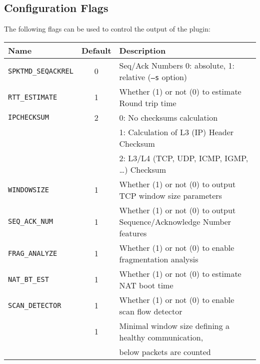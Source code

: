 \documentclass[documentation]{subfiles}
\begin{document}
\subsection{Configuration Flags}
The following flags can be used to control the output of the plugin:
\begin{longtable}{lcl}
    \toprule
    {\bf Name} & {\bf Default} & {\bf Description} \\
    \midrule\endhead%
    {\tt SPKTMD\_SEQACKREL} & 0 & Seq/Ack Numbers 0: absolute, 1: relative ({\tt --s} option)\\
    {\tt RTT\_ESTIMATE}     & 1 & Whether (1) or not (0) to estimate Round trip time\\
    {\tt IPCHECKSUM}        & 2 & 0: No checksums calculation\\
                            &   & 1: Calculation of L3 (IP) Header Checksum\\
                            &   & 2: L3/L4 (TCP, UDP, ICMP, IGMP, \ldots) Checksum \\
    {\tt WINDOWSIZE}        & 1 & Whether (1) or not (0) to output TCP window size parameters\\
    {\tt SEQ\_ACK\_NUM}     & 1 & Whether (1) or not (0) to output Sequence/Acknowledge Number features\\
    {\tt FRAG\_ANALYZE}     & 1 & Whether (1) or not (0) to enable fragmentation analysis\\
    {\tt NAT\_BT\_EST}      & 1 & Whether (1) or not (0) to estimate NAT boot time\\
    {\tt SCAN\_DETECTOR}    & 1 & Whether (1) or not (0) to enable scan flow detector\\
    {\tt\nameref{WINMIN}}   & 1 & Minimal window size defining a healthy communication,\\
                            &   & below packets are counted\\
    \bottomrule
\end{longtable}
\end{document}
